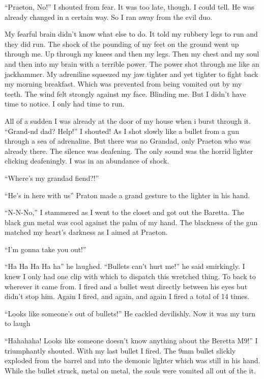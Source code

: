 ``Praeton, No!'' I shouted from fear. It was too late, though. I
could tell. He was already changed in a certain way. So I ran away
from the evil duo.



My fearful brain didn't know what else to do. It told my rubbery
legs to run and they did run. The shock of the pounding of my feet
on the ground went up through me. Up through my knees and then my
legs. Then my chest and my soul and then into my brain with a
terrible power. The power shot through me like an jackhammer. My
adreniline squeezed my jaw tighter and yet tighter to fight back my
morning breakfast. Which was prevented from being vomited out by my
teeth. The wind felt strongly against my face. Blinding me. But I
didn't have time to notice. I only had time to run.



All of a sudden I was already at the door of my house when i burst
through it. ``Grand-nd dad? Help!'' I shouted! As I shot slowly like
a bullet from a gun through a sea of adrenaline. But there was no
Grandad, only Praeton who was already there. The silence was
deafening. The only sound was the horrid lighter clicking
deafeningly. I was in an abundance of shock.



``Where's my grandad fiend?!''



``He's in here with us'' Praton made a grand gesture to the lighter
in his hand.



``N-N-No,'' I stammered as I went to the closet and got out the
Baretta. The black gun metal was cool against the palm of my hand.
The blackness of the gun matched my heart's darkness as I aimed at
Praeton.

``I'm gonna take you out!''

``Ha Ha Ha Ha ha'' he laughed. ``Bullets can't hurt me!'' he said
smirkingly. I knew I only had one clip with which to dispatch this
wretched thing. To back to wherever it came from. I fired and a
bullet went directly between his eyes but didn't stop him. Again I
fired, and again, and again I fired a total of 14 times.



``Looks like someone's out of bullets!'' He cackled devilishly. Now
it was my turn to laugh



``Hahahaha! Looks like someone doesn't know anything about the
Beretta M9!'' I triumphantly shouted. With my last bullet I fired.
The 9mm bullet slickly exploded from the barrel and into the
demonic lighter which was still in his hand. While the bullet
struck, metal on metal, the souls were vomited all out of the
it.



